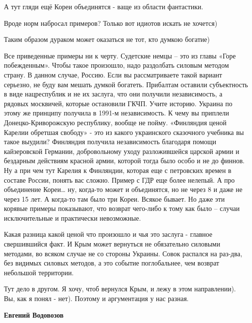 \begin{itemize}
А тут гляди ещё Кореи объединятся - ваще из области фантастики.

Вроде норм набросал примеров? Только вот идиотов искать не хочется)

Таким образом дураком может оказаться не тот, кто думкою богатие)

\begin{itemize} %

Все приведенные примеры ни к черту. Судетские немцы – это из главы «Горе
побежденным». Чтобы такое произошло, надо раздолбать силовым методом страну. В
данном случае, Россию. Если вы рассматриваете такой вариант серьезно, не буду
вам мешать думкой богатеть. Прибалтам оставили субъектность в виде нацреспублик
и не их заслуга, что они получили независимость, а рядовых москвичей, которые
остановили ГКЧП. Учите историю. Украина по этому же принципу получила в 1991-м
независимость. К чему вы приплели Донецко-Криворожскую республику, вообще не
пойму. «Финляндия ценой Карелии обретшая свободу» - это из какого украинского
сказочного учебника вы такое выудили? Финляндия получила независимость
благодаря помощи кайзеровской Германии, добровольному уходу разложившейся
царской армии и бездарным действиям красной армии, которой тогда было особо и
не до финнов. Ну а при чем тут Карелия к Финляндии, которая еще с петровских
времен в составе России, понять вас сложно. Пример с ГДР еще более нелепый. А
про объединение Кореи… ну, когда-то может и объединятся, но не через 8 и даже
не через 15 лет. А когда-то там было три Кореи. Всякое бывает. Но даже эти
корявые примеры показывают, что возврат чего-либо к тому как было – случаи
исключительные и практически невозможные.


Какая разница какой ценой что произошло и чья это заслуга - главное
свершившийся факт. И Крым может вернуться не обязательно силовыми методами, во
всяком случае не со стороны Украины. Совок распался на раз-два, без видимых
силовых методов, а это событие поглобальнее, чем возврат небольшой территории.

Тут дело в другом. Я хочу, чтоб вернулся Крым, и лежу в этом направлении). Вы,
как я понял - нет). Поэтому и аргументация у нас разная.

\textbf{Евгений Водовозов} 


\end{itemize}
\end{itemize}
